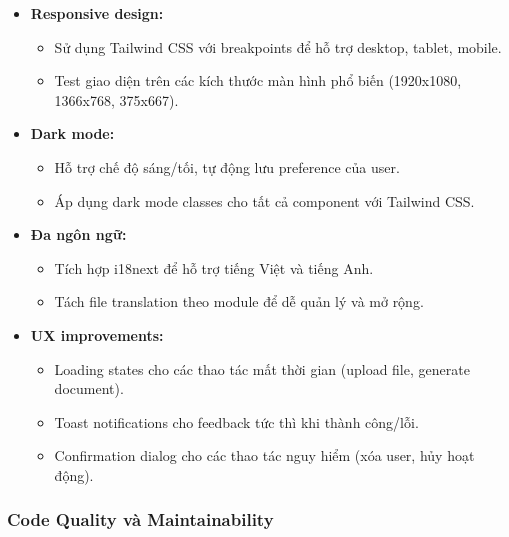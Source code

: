 \begin{itemize}
    \item \textbf{Responsive design:}
    \begin{itemize}
        \item Sử dụng Tailwind CSS với breakpoints để hỗ trợ desktop, tablet, mobile.
        \item Test giao diện trên các kích thước màn hình phổ biến (1920x1080, 1366x768, 375x667).
    \end{itemize}
    
    \item \textbf{Dark mode:}
    \begin{itemize}
        \item Hỗ trợ chế độ sáng/tối, tự động lưu preference của user.
        \item Áp dụng dark mode classes cho tất cả component với Tailwind CSS.
    \end{itemize}
    
    \item \textbf{Đa ngôn ngữ:}
    \begin{itemize}
        \item Tích hợp i18next để hỗ trợ tiếng Việt và tiếng Anh.
        \item Tách file translation theo module để dễ quản lý và mở rộng.
    \end{itemize}
    
    \item \textbf{UX improvements:}
    \begin{itemize}
        \item Loading states cho các thao tác mất thời gian (upload file, generate document).
        \item Toast notifications cho feedback tức thì khi thành công/lỗi.
        \item Confirmation dialog cho các thao tác nguy hiểm (xóa user, hủy hoạt động).
    \end{itemize}
\end{itemize}

\subsubsection{Code Quality và Maintainability}

